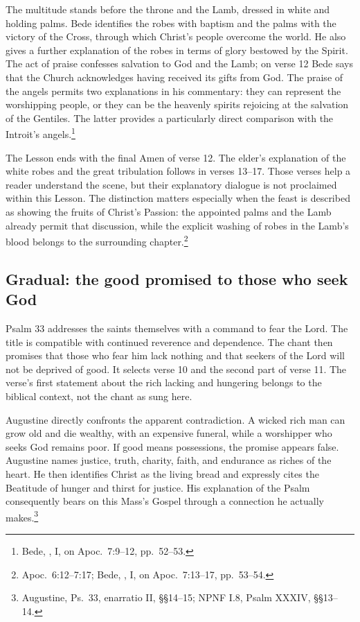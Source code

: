 The multitude stands before the throne and the Lamb, dressed in white and
holding palms. Bede identifies the robes with baptism and the palms with the
victory of the Cross, through which Christ's people overcome the world.
He also gives a further explanation of the robes in terms of glory bestowed
by the Spirit. The act of praise confesses salvation to God and the Lamb;
on verse 12 Bede says that the Church acknowledges having received its gifts
from God. The praise of the angels permits two explanations in his commentary:
they can represent the worshipping people, or they can be the heavenly
spirits rejoicing at the salvation of the Gentiles. The latter provides a
particularly direct comparison with the Introit's angels.\footnote{Bede,
, I, on Apoc.~7:9--12, pp.~52--53.}

The Lesson ends with the final Amen of verse 12. The elder's explanation of
the white robes and the great tribulation follows in verses 13--17.
Those verses help a reader understand the scene, but their explanatory
dialogue is not proclaimed within this Lesson. The distinction matters
especially when the feast is described as showing the fruits of Christ's
Passion: the appointed palms and the Lamb already permit that discussion,
while the explicit washing of robes in the Lamb's blood belongs to the
surrounding chapter.\footnote{Apoc.~6:12--7:17; Bede,
, I, on Apoc.~7:13--17, pp.~53--54.}

\subsection{Gradual: the good promised to those who seek God}
Psalm 33 addresses the saints themselves with a command to fear the Lord.
The title is compatible with continued reverence and dependence. The chant
then promises that those who fear him lack nothing and that seekers of the
Lord will not be deprived of good. It selects verse 10 and the second part
of verse 11. The verse's first statement about the rich lacking and hungering
belongs to the biblical context, not the chant as sung here.

Augustine directly confronts the apparent contradiction. A wicked rich man
can grow old and die wealthy, with an expensive funeral, while a worshipper
who seeks God remains poor. If good means possessions, the promise appears
false. Augustine names justice, truth, charity, faith, and endurance as
riches of the heart. He then identifies Christ as the living bread and
expressly cites the Beatitude of hunger and thirst for justice. His
explanation of the Psalm consequently bears on this Mass's Gospel through a
connection he actually makes.\footnote{Augustine, Ps.~33, enarratio II,
\S\S14--15; NPNF I.8, Psalm XXXIV, \S\S13--14.}

